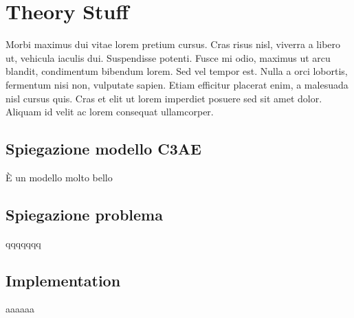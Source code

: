 
\chapter{Theory Stuff}
Morbi maximus dui vitae lorem pretium cursus. Cras risus nisl, viverra a libero ut, vehicula iaculis dui. Suspendisse potenti. Fusce mi odio, maximus ut arcu blandit, condimentum bibendum lorem. Sed vel tempor est. Nulla a orci lobortis, fermentum nisi non, vulputate sapien. Etiam efficitur placerat enim, a malesuada nisl cursus quis. Cras et elit ut lorem imperdiet posuere sed sit amet dolor. Aliquam id velit ac lorem consequat ullamcorper.
\section{Spiegazione modello C3AE}
È un modello molto bello
\section{Spiegazione problema}
qqqqqqq
\section{Implementation}
aaaaaa